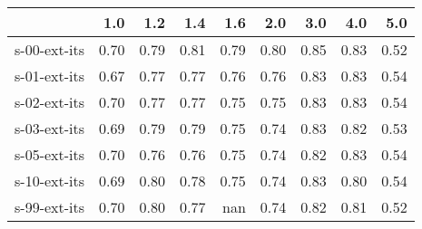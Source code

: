 \begin{tabular}{lrrrrrrrr}
\toprule
{} &  1.0 &  1.2 &  1.4 &  1.6 &  2.0 &  3.0 &  4.0 &  5.0 \\
\midrule
s-00-ext-its & 0.70 & 0.79 & 0.81 & 0.79 & 0.80 & 0.85 & 0.83 & 0.52 \\
s-01-ext-its & 0.67 & 0.77 & 0.77 & 0.76 & 0.76 & 0.83 & 0.83 & 0.54 \\
s-02-ext-its & 0.70 & 0.77 & 0.77 & 0.75 & 0.75 & 0.83 & 0.83 & 0.54 \\
s-03-ext-its & 0.69 & 0.79 & 0.79 & 0.75 & 0.74 & 0.83 & 0.82 & 0.53 \\
s-05-ext-its & 0.70 & 0.76 & 0.76 & 0.75 & 0.74 & 0.82 & 0.83 & 0.54 \\
s-10-ext-its & 0.69 & 0.80 & 0.78 & 0.75 & 0.74 & 0.83 & 0.80 & 0.54 \\
s-99-ext-its & 0.70 & 0.80 & 0.77 &  nan & 0.74 & 0.82 & 0.81 & 0.52 \\
\bottomrule
\end{tabular}
